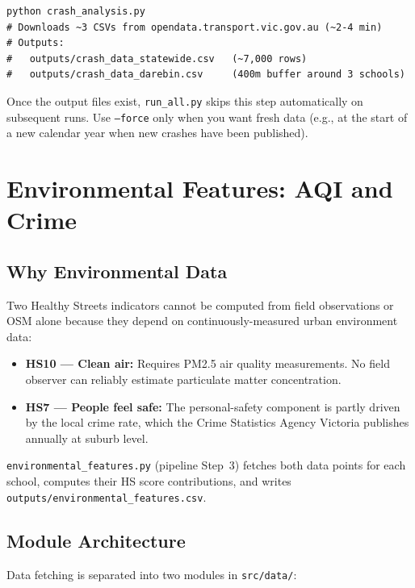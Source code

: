 \documentclass[11pt,a4paper,openany]{book}
\begin{document}
\begin{lstlisting}[style=bash, caption={Running the crash data downloader.}]
python crash_analysis.py
# Downloads ~3 CSVs from opendata.transport.vic.gov.au (~2-4 min)
# Outputs:
#   outputs/crash_data_statewide.csv   (~7,000 rows)
#   outputs/crash_data_darebin.csv     (400m buffer around 3 schools)
\end{lstlisting}

Once the output files exist, \texttt{run\_all.py} skips this step automatically
on subsequent runs.  Use \texttt{--force} only when you want fresh data (e.g.,
at the start of a new calendar year when new crashes have been published).

\chapter{Environmental Features: AQI and Crime}

\section{Why Environmental Data}

Two Healthy Streets indicators cannot be computed from field observations or OSM
alone because they depend on continuously-measured urban environment data:

\begin{itemize}
  \item \textbf{HS10 --- Clean air:} Requires PM2.5 air quality measurements.
        No field observer can reliably estimate particulate matter concentration.
  \item \textbf{HS7 --- People feel safe:} The personal-safety component is partly
        driven by the local crime rate, which the Crime Statistics Agency Victoria
        publishes annually at suburb level.
\end{itemize}

\texttt{environmental\_features.py} (pipeline Step~3) fetches both data points
for each school, computes their HS score contributions, and writes
\texttt{outputs/environmental\_features.csv}.

\section{Module Architecture}

Data fetching is separated into two modules in \texttt{src/data/}:
\end{document}
